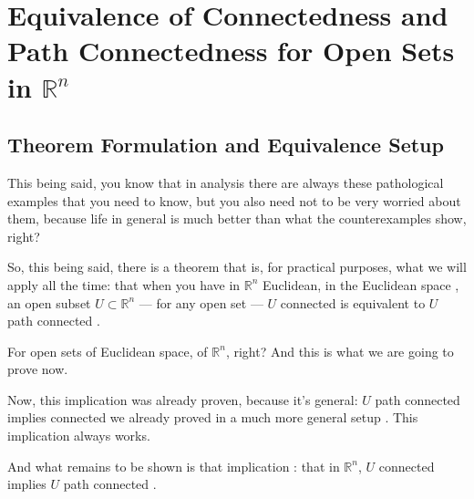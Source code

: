 \section{Equivalence of Connectedness and Path Connectedness for Open Sets in \texorpdfstring{$\mathbb{R}^n$}{R\textasciicircum n}}

\subsection{Theorem Formulation and Equivalence Setup}

\begin{speech}[00:49:58 - 00:51:53]
This being said, you know that in analysis there are always these pathological examples that you need to know, but you also need not to be very worried about them, because life in general is much better than what the counterexamples show, right?

So, this being said, there is a theorem that is, for practical purposes, what we will apply all the time: that when you have in $\mathbb{R}^n$ Euclidean, in the Euclidean space , an open subset $U \subset \mathbb{R}^n$  --- for any open set --- $U$ connected is equivalent to $U$ path connected .

For open sets of Euclidean space, of $\mathbb{R}^n$, right? And this is what we are going to prove now.

Now, this implication was already proven, because it's general: $U$ path connected implies connected we already proved in a much more general setup . This implication always works.

And what remains to be shown is that implication : that in $\mathbb{R}^n$, $U$ connected implies $U$ path connected .
\end{speech}

\begin{content}
\end{content}

